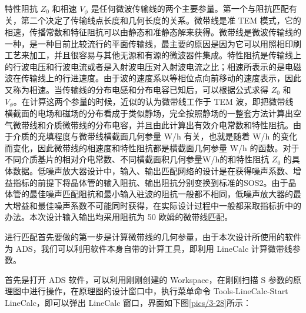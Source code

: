 特性阻抗 $Z_0$ 和相速 $V_\phi$ 是任何微波传输线的两个主要参量。第一个与阻抗匹配有关，第二个决定了传输线点长度和几何长度的关系。微带线是准 TEM 模式，它的相速，传播常数和特征阻抗可以由静态和准静态解来获得。微带线是微波传输线的一种，是一种目前比较流行的平面传输线，最主要的原因是因为它可以用照相印刷工艺来加工，并且很容易与其他无源和有源的微波器件集成。特性阻抗是传输线上的行波电压和行波电流或者是入射波电压对入射波电流之比；相速所表示的是电磁波在传输线上的行进速度。由于波的速度系以等相位点向前移动的速度表示，因此又称为相速。当传输线的分布电感和分布电容已知后，可以根据公式求得 $Z_0$ 和 $V_\phi$。在计算这两个参量的时候，近似的认为微带线工作于 TEM 波，即把微带线横截面的电场和磁场的分布看成于类似静场，完全按照静场的一整套方法计算出空气微带线和介质微带线的分布电容，并且由此计算出有效介电常数和特性阻抗。由于介质的充填程度与微带线横截面几何参量 W/h 有关，也就是随着 W/h 的变化而变化，因此微带线的相速度和特性阻抗都是横截面几何参量 W/h 的函数。对于不同介质基片的相对介电常数、不同横截面积几何参量W/h的和特性阻抗 $Z_0$ 的具体数据。低噪声放大器设计中，输入、输出匹配网络的设计是在获得噪声系数、增益指标的前提下将晶体管的输入阻抗、输出阻抗分别变换到标准的SOS2。由于晶体管的最佳噪声匹配阻抗和最小输入驻波的阻抗一般都不相同，低噪声放大器的最大增益和最佳噪声系数不可能同时获得，在实际设计过程中一般都采取指标折中的办法。本次设计输入输出均采用阻抗为 50 欧姆的微带线匹配。

进行匹配首先要做的第一步是计算微带线的几何参量，由于本次设计所使用的软件为 ADS，我们可以利用软件本身自带的计算工具，即利用 LineCalc 计算微带线参数。

首先是打开 ADS 软件，可以利用刚刚创建的 Workspace，在刚刚扫描 S 参数的原理图中进行操作，在原理图的设计窗口中，执行菜单命令 Tools-LineCalc-Start LineCalc，即可以弹出 LineCalc 窗口，界面如下图\ref{pics/3-28}所示：  



